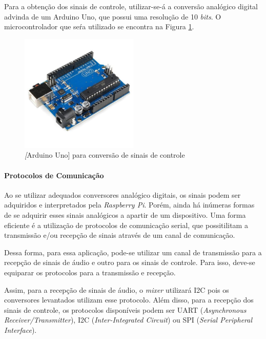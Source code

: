     
    
    Para a obtenção dos sinais de controle, utilizar-se-á a conversão analógico digital advinda de um Arduino Uno, que possui uma resolução de 10 \textit{bits}. O microcontrolador que seŕa utilizado se encontra na Figura \ref{fig64}.

    \begin{figure}[h]
        \centering
        \includegraphics[width=0.5\textwidth]{figuras/fig64.jpeg}
        \caption{\textit[Arduino Uno] para conversão de sinais de controle}
        \label{fig64}
    \end{figure}    

    \paragraph{Protocolos de Comunicação}
    Ao se utilizar adequados conversores analógico digitais, os sinais podem ser adquiridos e interpretados pela \textit{Raspberry Pi}. Porém, ainda há inúmeras formas de se adquirir esses sinais analógicos a apartir de um dispositivo. Uma forma eficiente é a utilização de protocolos de comunicação serial, que possitilitam a transmissão e/ou recepção de sinais através de um canal de comunicação.

    Dessa forma, para essa aplicação, pode-se utilizar um canal de transmissão para a recepção de sinais de áudio e outro para os sinais de controle. Para isso, deve-se equiparar os protocolos para a transmissão e recepção.

    Assim, para a recepção de sinais de áudio, o \textit{mixer} utilizará I2C pois os conversores levantados utilizam esse protocolo. Além disso, para a recepção dos sinais de controle, os protocolos disponíveis podem ser UART (\textit{Asynchronous Receiver/Transmitter}), I2C (\textit{Inter-Integrated Circuit}) ou SPI (\textit{Serial Peripheral Interface}).


